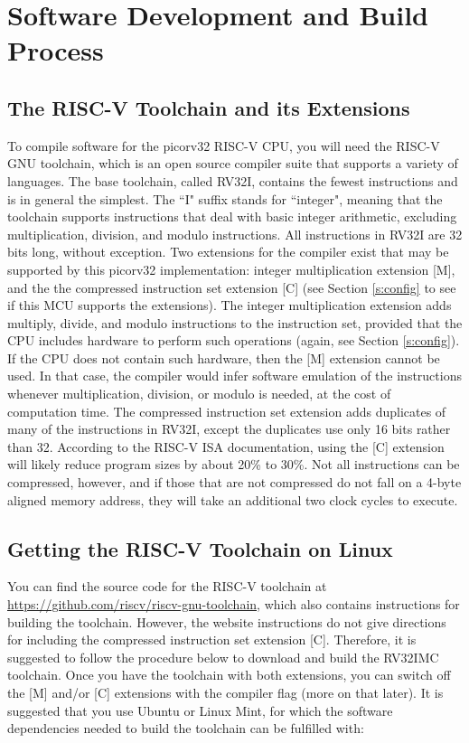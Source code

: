 \documentclass[11pt,pdftex,portrait,letterpaper]{article}
\begin{document}
\section{Software Development and Build Process} \label{s:software}

\subsection{The RISC-V Toolchain and its Extensions}
To compile software for the picorv32 RISC-V CPU, you will need the RISC-V GNU toolchain, which is an open source compiler suite that supports a variety of languages. The base toolchain, called RV32I, contains the fewest instructions and is in general the simplest. The ``I" suffix stands for ``integer", meaning that the toolchain supports instructions that deal with basic integer arithmetic, excluding multiplication, division, and modulo instructions. All instructions in RV32I are 32 bits long, without exception. Two extensions for the compiler exist that may be supported by this picorv32 implementation: integer multiplication extension [M], and the the compressed instruction set extension [C] (see Section \ref{s:config} to see if this MCU supports the extensions). The integer multiplication extension adds multiply, divide, and modulo instructions to the instruction set, provided that the CPU includes hardware to perform such operations (again, see Section \ref{s:config}). If the CPU does not contain such hardware, then the [M] extension cannot be used. In that case, the compiler would infer software emulation of the instructions whenever multiplication, division, or modulo is needed, at the cost of computation time. The compressed instruction set extension adds duplicates of many of the instructions in RV32I, except the duplicates use only 16 bits rather than 32. According to the RISC-V ISA documentation, using the [C] extension will likely reduce program sizes by about 20\% to 30\%. Not all instructions can be compressed, however, and if those that are not compressed do not fall on a 4-byte aligned memory address, they will take an additional two clock cycles to execute.

\subsection{Getting the RISC-V Toolchain on Linux} \label{ss:linuxinstall}
You can find the source code for the RISC-V toolchain at \href{https://github.com/riscv/riscv-gnu-toolchain}{https://github.com/riscv/riscv-gnu-toolchain}, which also contains instructions for building the toolchain. However, the website instructions do not give directions for including the compressed instruction set extension [C]. Therefore, it is suggested to follow the procedure below to download and build the RV32IMC toolchain. Once you have the toolchain with both extensions, you can switch off the [M] and/or [C] extensions with the  compiler flag (more on that later). It is suggested that you use Ubuntu or Linux Mint, for which the software dependencies needed to build the toolchain can be fulfilled with:
\end{document}

